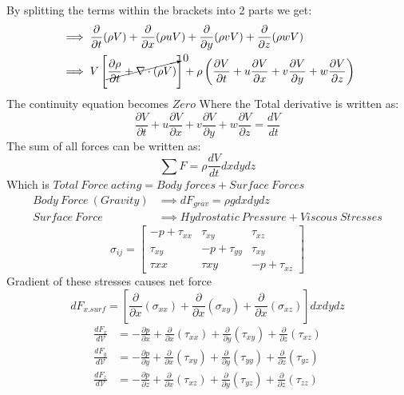 \documentclass{article}
\begin{document}
By splitting the terms within the brackets into 2 parts we get:
\begin{equation}
\begin{aligned}
    & \implies \frac{\partial}{\partial{t}}(\rho V)+\frac{\partial}{\partial{x}}(\rho uV)+\frac{\partial}{\partial{y}}(\rho vV)+\frac{\partial}{\partial{z}}(\rho wV) \\ & \implies V \left[\cancelto{0}{\frac{\partial{\rho}}{\partial{t}}+\nabla \cdot (\rho V)}\right]+ \rho \left (\frac{\partial{V}}{\partial{t}}+u\frac{\partial{V}}{\partial{x}}+v\frac{\partial{V}}{\partial{y}}+w\frac{\partial{V}}{\partial{z}}\right)
\end{aligned}
\end{equation}
The continuity equation becomes $Zero$
Where the Total derivative is written as:
\begin{equation}
    \frac{\partial{V}}{\partial{t}}+u\frac{\partial{V}}{\partial{x}}+v\frac{\partial{V}}{\partial{y}}+w\frac{\partial{V}}{\partial{z}}=\frac{dV}{dt}
\end{equation}
The sum of all forces can be written as:
\begin{equation}
    \sum F = \rho \frac{dV}{dt} dxdydz
\end{equation}
Which is $Total\ Force\ acting = Body\ forces + Surface\ Forces$
\begin{equation}
\begin{aligned}
    Body\ Force\ (Gravity) & \implies dF_{grav}=\rho g dxdydz \\
    Surface\ Force & \implies Hydrostatic\ Pressure + Viscous\ Stresses
\end{aligned}
\end{equation}
$$\sigma_{ij}=
\begin{bmatrix}
 -p+\tau_{xx} & \tau_{xy} & \tau_{xz}\\
 \tau_{xy} & -p+\tau_{yy} & \tau_{xy}\\
 \tau{xx} & \tau{xy} & -p+\tau_{xz}
\end{bmatrix}$$
Gradient of these stresses causes net force
$$dF_{x.surf}=\left[\frac{\partial}{\partial{x}}(\sigma_{xx})+\frac{\partial}{\partial{x}}(\sigma_{xy})+\frac{\partial}{\partial{x}}(\sigma_{xz})\right]dxdydz $$
\begin{align}
    \frac{dF_x}{d\mathcal{V}} &= -\frac{\partial{p}}{\partial{x}}+\frac{\partial}{\partial{x}}(\tau_{xx})+\frac{\partial}{\partial{y}}(\tau_{xy})+\frac{\partial}{\partial{z}}(\tau_{xz})\\
    \frac{dF_y}{d\mathcal{V}} &= -\frac{\partial{p}}{\partial{y}}+\frac{\partial}{\partial{x}}(\tau_{xy})+\frac{\partial}{\partial{y}}(\tau_{yy})+\frac{\partial}{\partial{z}}(\tau_{yz})\\
    \frac{dF_z}{d\mathcal{V}} &= -\frac{\partial{p}}{\partial{z}}+\frac{\partial}{\partial{x}}(\tau_{xz})+\frac{\partial}{\partial{y}}(\tau_{yz})+\frac{\partial}{\partial{z}}(\tau_{zz}) 
\end{align}
\end{document}
